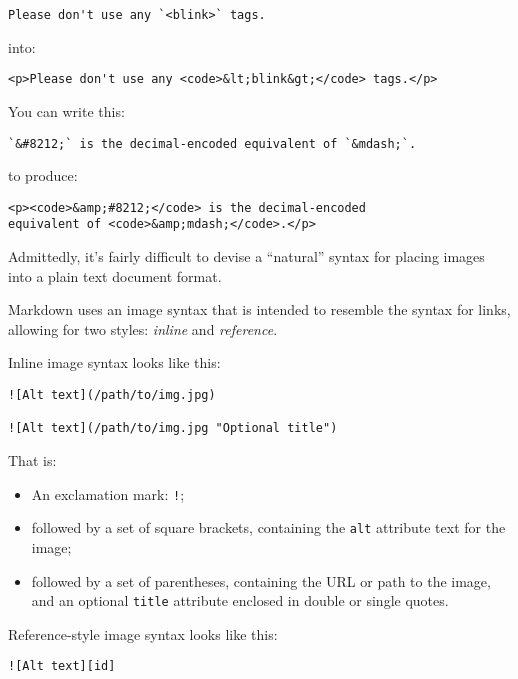 \begin{verbatim}
Please don't use any `<blink>` tags.
\end{verbatim}

into:

\begin{verbatim}
<p>Please don't use any <code>&lt;blink&gt;</code> tags.</p>
\end{verbatim}

You can write this:

\begin{verbatim}
`&#8212;` is the decimal-encoded equivalent of `&mdash;`.
\end{verbatim}

to produce:

\begin{verbatim}
<p><code>&amp;#8212;</code> is the decimal-encoded
equivalent of <code>&amp;mdash;</code>.</p>
\end{verbatim}

Admittedly, it's fairly difficult to devise a ``natural'' syntax for
placing images into a plain text document format.

Markdown uses an image syntax that is intended to resemble the syntax
for links, allowing for two styles: \emph{inline} and \emph{reference}.

Inline image syntax looks like this:

\begin{verbatim}
![Alt text](/path/to/img.jpg)

![Alt text](/path/to/img.jpg "Optional title")
\end{verbatim}

That is:

\begin{itemize}
\item{} An exclamation mark: \texttt{!};

\item{} followed by a set of square brackets, containing the \texttt{alt}
attribute text for the image;

\item{} followed by a set of parentheses, containing the URL or path to
the image, and an optional \texttt{title} attribute enclosed in double
or single quotes.

\end{itemize}

Reference-style image syntax looks like this:

\begin{verbatim}
![Alt text][id]
\end{verbatim}


